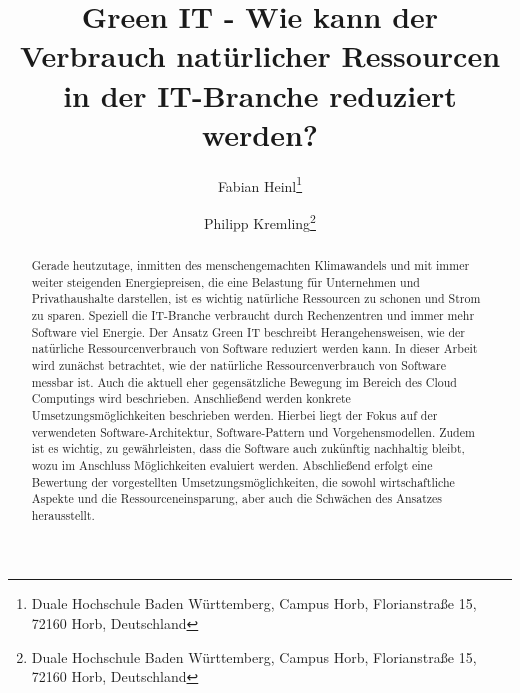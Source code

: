 \documentclass[utf8,biblatex]{lni}
\begin{document}
\title[Green IT]{Green IT - Wie kann der Verbrauch natürlicher Ressourcen in der IT-Branche reduziert werden?}
\author[Fabian Heinl \and Philipp Kremling]
{Fabian Heinl\footnote{Duale Hochschule Baden Württemberg, Campus Horb, Florianstraße 15, 72160 Horb,
Deutschland } \and
Philipp Kremling\footnote{Duale Hochschule Baden Württemberg, Campus Horb, Florianstraße 15, 72160 Horb,
Deutschland }}


\maketitle

\begin{abstract}
Gerade heutzutage, inmitten des menschengemachten Klimawandels und mit immer weiter steigenden Energiepreisen, die eine Belastung für Unternehmen und Privathaushalte darstellen, ist es wichtig natürliche Ressourcen zu schonen und Strom zu sparen. Speziell die IT-Branche verbraucht durch Rechenzentren und immer mehr Software viel Energie. Der Ansatz Green IT beschreibt Herangehensweisen, wie der natürliche Ressourcenverbrauch von Software reduziert werden kann. In dieser Arbeit wird zunächst betrachtet, wie der natürliche Ressourcenverbrauch von Software messbar ist. Auch die aktuell eher gegensätzliche Bewegung im Bereich des Cloud Computings wird beschrieben. Anschließend werden konkrete Umsetzungsmöglichkeiten beschrieben werden. Hierbei liegt der Fokus auf der verwendeten Software-Architektur, Software-Pattern und Vorgehensmodellen. Zudem ist es wichtig, zu gewährleisten, dass die Software auch zukünftig nachhaltig bleibt, wozu im Anschluss Möglichkeiten evaluiert werden. Abschließend erfolgt eine Bewertung der vorgestellten Umsetzungsmöglichkeiten, die sowohl wirtschaftliche Aspekte und die Ressourceneinsparung, aber auch die Schwächen des Ansatzes herausstellt.
\end{abstract}

\end{document}

